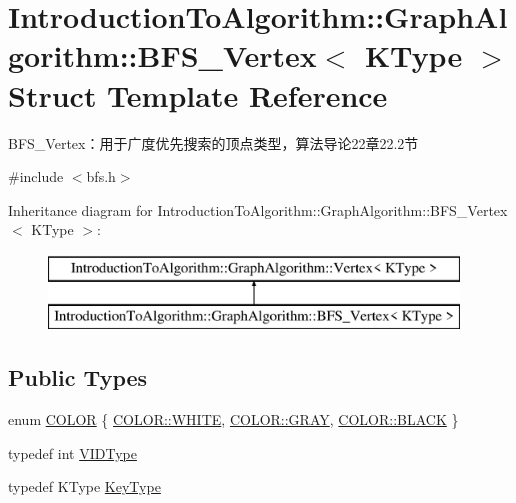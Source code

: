 \hypertarget{struct_introduction_to_algorithm_1_1_graph_algorithm_1_1_b_f_s___vertex}{}\section{Introduction\+To\+Algorithm\+:\+:Graph\+Algorithm\+:\+:B\+F\+S\+\_\+\+Vertex$<$ K\+Type $>$ Struct Template Reference}
\label{struct_introduction_to_algorithm_1_1_graph_algorithm_1_1_b_f_s___vertex}


B\+F\+S\+\_\+\+Vertex：用于广度优先搜索的顶点类型，算法导论22章22.2节  




{\ttfamily \#include $<$bfs.\+h$>$}

Inheritance diagram for Introduction\+To\+Algorithm\+:\+:Graph\+Algorithm\+:\+:B\+F\+S\+\_\+\+Vertex$<$ K\+Type $>$\+:\begin{figure}[H]
\begin{center}
\leavevmode
\includegraphics[height=2.000000cm]{struct_introduction_to_algorithm_1_1_graph_algorithm_1_1_b_f_s___vertex}
\end{center}
\end{figure}
\subsection*{Public Types}
\begin{DoxyCompactItemize}
\item 
enum \hyperlink{struct_introduction_to_algorithm_1_1_graph_algorithm_1_1_b_f_s___vertex_a3f00f12565def71750f1f163e0e52305}{C\+O\+L\+O\+R} \{ \hyperlink{struct_introduction_to_algorithm_1_1_graph_algorithm_1_1_b_f_s___vertex_a3f00f12565def71750f1f163e0e52305ab5bf627e448384cf3a4c35121ca6008d}{C\+O\+L\+O\+R\+::\+W\+H\+I\+T\+E}, 
\hyperlink{struct_introduction_to_algorithm_1_1_graph_algorithm_1_1_b_f_s___vertex_a3f00f12565def71750f1f163e0e52305a48bf014c704c9eaae100a98006a37bf7}{C\+O\+L\+O\+R\+::\+G\+R\+A\+Y}, 
\hyperlink{struct_introduction_to_algorithm_1_1_graph_algorithm_1_1_b_f_s___vertex_a3f00f12565def71750f1f163e0e52305a08d0012388564e95c3b4a7407cf04965}{C\+O\+L\+O\+R\+::\+B\+L\+A\+C\+K}
 \}
\item 
typedef int \hyperlink{struct_introduction_to_algorithm_1_1_graph_algorithm_1_1_b_f_s___vertex_a62cef758843cdaeefae2fc196f6bdb46}{V\+I\+D\+Type}
\item 
typedef K\+Type \hyperlink{struct_introduction_to_algorithm_1_1_graph_algorithm_1_1_b_f_s___vertex_a1e47ba34939458c68d7ccee8ebeccad2}{Key\+Type}
\end{DoxyCompactItemize}
